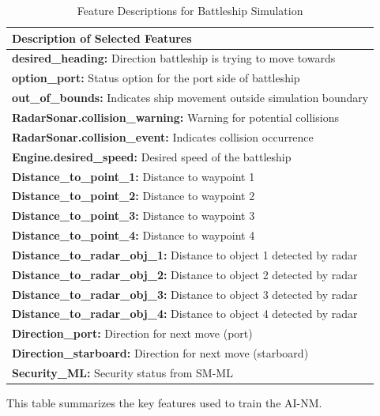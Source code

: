 \documentclass[conference]{IEEEtran}
\begin{document}
\begin{table}
\centering
\caption{Feature Descriptions for Battleship Simulation}
\label{tab:feature_descriptions}
\begin{tabular}{@{}p{8cm}@{}}
\toprule
\textbf{Description of Selected Features} \\
\midrule
\textbf{desired\_heading:} Direction battleship is trying to move towards  \\
\textbf{option\_port:} Status option for the port side of battleship  \\
\textbf{out\_of\_bounds:} Indicates ship movement outside simulation boundary  \\
\textbf{RadarSonar.collision\_warning:} Warning for potential collisions  \\
\textbf{RadarSonar.collision\_event:} Indicates collision occurrence  \\
\textbf{Engine.desired\_speed:} Desired speed of the battleship  \\
\textbf{Distance\_to\_point\_1:} Distance to waypoint 1  \\
\textbf{Distance\_to\_point\_2:} Distance to waypoint 2 \\
\textbf{Distance\_to\_point\_3:} Distance to waypoint 3  \\
\textbf{Distance\_to\_point\_4:} Distance to waypoint 4 \\
\textbf{Distance\_to\_radar\_obj\_1:} Distance to object 1 detected by radar  \\
\textbf{Distance\_to\_radar\_obj\_2:} Distance to object 2 detected by radar \\
\textbf{Distance\_to\_radar\_obj\_3:} Distance to object 3 detected by radar  \\
\textbf{Distance\_to\_radar\_obj\_4:} Distance to object 4 detected by radar  \\
\textbf{Direction\_port:} Direction for next move (port)  \\
\textbf{Direction\_starboard:} Direction for next move (starboard)  \\
\textbf{Security\_ML:} Security status from SM-ML  \\
\bottomrule
\end{tabular}
\begin{minipage}{0.44\textwidth}
\footnotesize This table summarizes the key features used to train the AI-NM.
\end{minipage}
\end{table}
\end{document}
